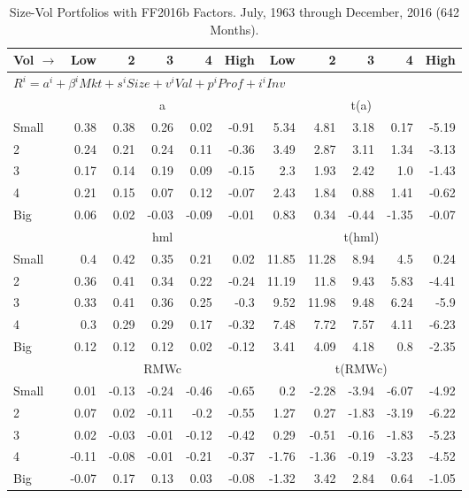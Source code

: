 
\begin{table}[!ht]
\centering
\caption{Size-Vol Portfolios with FF2016b Factors. \footnotesize{July, 1963 through December, 2016 (642 Months).}}
\begin{tabular}{lrrrrrrrrrr}
  \toprule
  Vol $\rightarrow$ & Low & 2 & 3 & 4 & High & Low & 2 & 3 & 4 & High \\ 
  \toprule
  \multicolumn{9}{l}{$R^i=a^i+\beta^iMkt+s^iSize+v^iVal+p^iProf+i^iInv$} \\

  

      & \multicolumn{5}{c}{a} & \multicolumn{5}{c}{t(a)} \\
    \cmidrule(r){2-6} \cmidrule(r){7-11}
      Small  & 0.38  & 0.38  & 0.26  & 0.02  & -0.91   & 5.34  & 4.81  & 3.18  & 0.17  & -5.19  \\
          2  & 0.24  & 0.21  & 0.24  & 0.11  & -0.36   & 3.49  & 2.87  & 3.11  & 1.34  & -3.13  \\
          3  & 0.17  & 0.14  & 0.19  & 0.09  & -0.15   & 2.3  & 1.93  & 2.42  & 1.0  & -1.43  \\
          4  & 0.21  & 0.15  & 0.07  & 0.12  & -0.07   & 2.43  & 1.84  & 0.88  & 1.41  & -0.62  \\
      Big    & 0.06  & 0.02  & -0.03  & -0.09  & -0.01   & 0.83  & 0.34  & -0.44  & -1.35  & -0.07  \\

  


      & \multicolumn{5}{c}{hml} & \multicolumn{5}{c}{t(hml)} \\
    \cmidrule(r){2-6} \cmidrule(r){7-11}
      Small  & 0.4  & 0.42  & 0.35  & 0.21  & 0.02   & 11.85  & 11.28  & 8.94  & 4.5  & 0.24  \\
          2  & 0.36  & 0.41  & 0.34  & 0.22  & -0.24   & 11.19  & 11.8  & 9.43  & 5.83  & -4.41  \\
          3  & 0.33  & 0.41  & 0.36  & 0.25  & -0.3   & 9.52  & 11.98  & 9.48  & 6.24  & -5.9  \\
          4  & 0.3  & 0.29  & 0.29  & 0.17  & -0.32   & 7.48  & 7.72  & 7.57  & 4.11  & -6.23  \\
      Big    & 0.12  & 0.12  & 0.12  & 0.02  & -0.12   & 3.41  & 4.09  & 4.18  & 0.8  & -2.35  \\

  

      & \multicolumn{5}{c}{RMWc} & \multicolumn{5}{c}{t(RMWc)} \\
    \cmidrule(r){2-6} \cmidrule(r){7-11}
      Small  & 0.01  & -0.13  & -0.24  & -0.46  & -0.65   & 0.2  & -2.28  & -3.94  & -6.07  & -4.92  \\
          2  & 0.07  & 0.02  & -0.11  & -0.2  & -0.55   & 1.27  & 0.27  & -1.83  & -3.19  & -6.22  \\
          3  & 0.02  & -0.03  & -0.01  & -0.12  & -0.42   & 0.29  & -0.51  & -0.16  & -1.83  & -5.23  \\
          4  & -0.11  & -0.08  & -0.01  & -0.21  & -0.37   & -1.76  & -1.36  & -0.19  & -3.23  & -4.52  \\
      Big    & -0.07  & 0.17  & 0.13  & 0.03  & -0.08   & -1.32  & 3.42  & 2.84  & 0.64  & -1.05  \\


\end{tabular}
\end{table}
